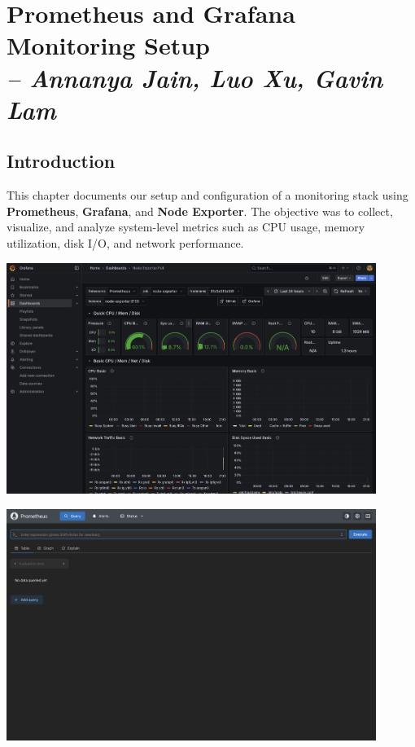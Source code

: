 \chapter{Prometheus and Grafana Monitoring Setup \\
\small{\textit{-- Annanya Jain, Luo Xu, Gavin Lam}
\label{Chapter::Prometheus and Grafana Monitoring Setup}}}

\section{Introduction}

This chapter documents our setup and configuration of a monitoring stack using \textbf{Prometheus}, \textbf{Grafana}, and \textbf{Node Exporter}. The objective was to collect, visualize, and analyze system-level metrics such as CPU usage, memory utilization, disk I/O, and network performance. 

\begin{center}
  \includegraphics[width=0.9\textwidth]{png/Grafana.png}
\end{center}

\begin{center}
  \includegraphics[width=0.9\textwidth]{png/Prometheus.png}
\end{center}


